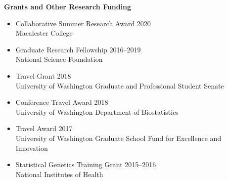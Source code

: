 \documentclass[margin]{res}
\begin{document}
\begin{resume}
\textbf{Grants and Other Research Funding}
\begin{itemize}
\item Collaborative Summer Research Award  \hfill 2020 \\
Macalester College
\item Graduate Research Fellowship \hfill 2016--2019 \\
National Science Foundation  
\item Travel Grant \hfill 2018 \\ University of Washington Graduate and Professional Student Senate
\item Conference Travel Award \hfill 2018 \\
University of Washington Department of Biostatistics
\item Travel Award \hfill 2017 \\
University of Washington Graduate School Fund for Excellence and Innovation
\item Statistical Genetics Training Grant \hfill 2015--2016  \\
National Institutes of Health %
\end{itemize}


\end{resume}
\end{document}

